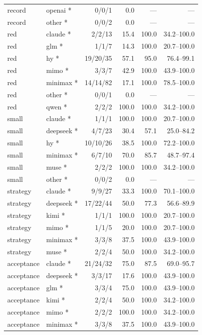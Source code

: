 \documentclass[
  10pt,
  a4paper,
]{article}
\begin{document}
\begin{longtable}[]{@{}llrrrr@{}}
record & openai * & 0/0/1 & 0.0 & --- & --- \\
record & other * & 0/0/2 & 0.0 & --- & --- \\
red & claude * & 2/2/13 & 15.4 & 100.0 & 34.2--100.0 \\
red & glm * & 1/1/7 & 14.3 & 100.0 & 20.7--100.0 \\
red & hy * & 19/20/35 & 57.1 & 95.0 & 76.4--99.1 \\
red & mimo * & 3/3/7 & 42.9 & 100.0 & 43.9--100.0 \\
red & minimax * & 14/14/82 & 17.1 & 100.0 & 78.5--100.0 \\
red & other * & 0/0/1 & 0.0 & --- & --- \\
red & qwen * & 2/2/2 & 100.0 & 100.0 & 34.2--100.0 \\
small & claude * & 1/1/1 & 100.0 & 100.0 & 20.7--100.0 \\
small & deepseek * & 4/7/23 & 30.4 & 57.1 & 25.0--84.2 \\
small & hy * & 10/10/26 & 38.5 & 100.0 & 72.2--100.0 \\
small & minimax * & 6/7/10 & 70.0 & 85.7 & 48.7--97.4 \\
small & muse * & 2/2/2 & 100.0 & 100.0 & 34.2--100.0 \\
small & other * & 0/0/2 & 0.0 & --- & --- \\
strategy & claude * & 9/9/27 & 33.3 & 100.0 & 70.1--100.0 \\
strategy & deepseek * & 17/22/44 & 50.0 & 77.3 & 56.6--89.9 \\
strategy & kimi * & 1/1/1 & 100.0 & 100.0 & 20.7--100.0 \\
strategy & mimo * & 1/1/5 & 20.0 & 100.0 & 20.7--100.0 \\
strategy & minimax * & 3/3/8 & 37.5 & 100.0 & 43.9--100.0 \\
strategy & muse * & 2/2/4 & 50.0 & 100.0 & 34.2--100.0 \\
acceptance & claude * & 21/24/32 & 75.0 & 87.5 & 69.0--95.7 \\
acceptance & deepseek * & 3/3/17 & 17.6 & 100.0 & 43.9--100.0 \\
acceptance & glm * & 3/3/4 & 75.0 & 100.0 & 43.9--100.0 \\
acceptance & kimi * & 2/2/4 & 50.0 & 100.0 & 34.2--100.0 \\
acceptance & mimo * & 2/2/2 & 100.0 & 100.0 & 34.2--100.0 \\
acceptance & minimax * & 3/3/8 & 37.5 & 100.0 & 43.9--100.0 \\

\end{longtable}
\end{document}
